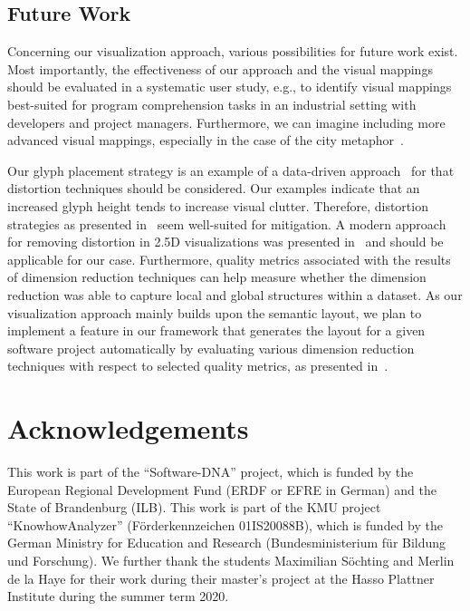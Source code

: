 \documentclass[runningheads]{llncs}
\begin{document}
\subsection{Future Work}
Concerning our visualization approach, various possibilities for future work exist. 
Most importantly, the effectiveness of our approach and the visual mappings should be evaluated in a systematic user study, e.g., to identify visual mappings best-suited for program comprehension tasks in an industrial setting with developers and project managers.
Furthermore, we can imagine including more advanced visual mappings, especially in the case of the city metaphor~\cite{limberger2019-softwaremap}.

Our glyph placement strategy is an example of a data-driven approach~\cite{ward2002taxonomy} for that distortion techniques should be considered.
Our examples indicate that an increased glyph height tends to increase visual clutter.
Therefore, distortion strategies as presented in~\cite{ward2002taxonomy} seem well-suited for mitigation.
A modern approach for removing distortion in 2.5D visualizations was presented in~\cite{vollmer20202} and should be applicable for our case.
Furthermore, quality metrics associated with the results of dimension reduction techniques can help measure whether the dimension reduction was able to capture local and global structures within a dataset.
As our visualization approach mainly builds upon the semantic layout, we plan to implement a feature in our framework that generates the layout for a given software project automatically by evaluating various dimension reduction techniques with respect to selected quality metrics, as presented in~\cite{espadoto2021dimensionreduction}.

\section*{Acknowledgements}
This work is part of the \enquote{Software-DNA} project, which is funded by the European Regional Development Fund (ERDF or EFRE in German) and the State of Brandenburg (ILB). 
This work is part of the KMU project \enquote{KnowhowAnalyzer} (Förderkennzeichen 01IS20088B), which is funded by the German Ministry for Education and Research (Bundesministerium für Bildung und Forschung).
We further thank the students Maximilian Söchting and Merlin de la Haye for their work during their master's project at the Hasso Plattner Institute during the summer term 2020.



\end{document}

